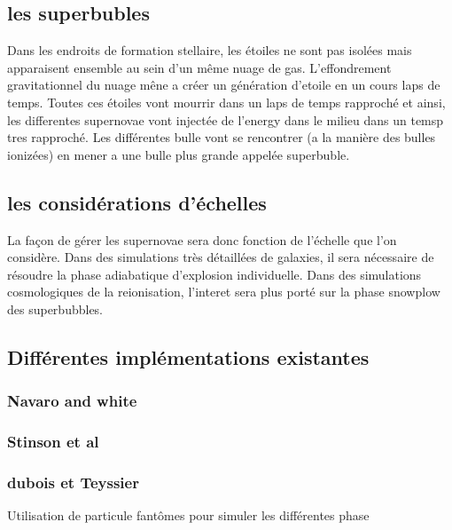\subsection{les superbubles}


Dans les endroits de formation stellaire, les étoiles ne sont pas isolées mais apparaisent ensemble au sein d'un même nuage de gas.
L'effondrement gravitationnel du nuage mêne a créer un génération d'etoile en un cours laps de temps.
Toutes ces étoiles vont mourrir dans un laps de temps rapproché et ainsi, les differentes supernovae vont injectée de l'energy dans le milieu dans un temsp tres rapproché.
Les différentes bulle vont se rencontrer (a la manière des bulles ionizées) en mener a une bulle plus grande appelée superbuble.


\subsection{les considérations d'échelles}
La façon de gérer les supernovae sera donc fonction de l'échelle que l'on considère.
Dans des simulations très détaillées de galaxies, il sera nécessaire de résoudre la phase adiabatique d'explosion individuelle.
Dans des simulations cosmologiques de la reionisation, l'interet sera plus porté sur la phase snowplow des superbubbles.


\subsection{ Différentes implémentations existantes}



\subsubsection{Navaro and white}


\subsubsection{Stinson et al}



\subsubsection{dubois et Teyssier}

Utilisation de particule fantômes pour simuler les différentes phase

